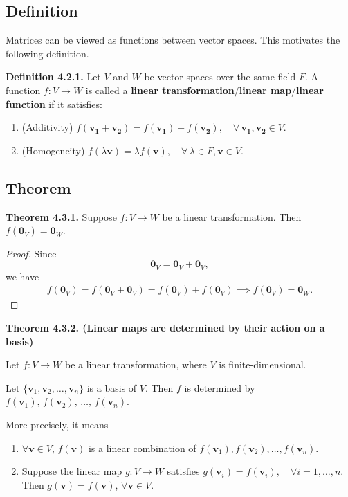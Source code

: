 \documentclass[12pt]{article}
\begin{document}
\subsection{Definition}

Matrices can be viewed as functions between vector spaces.  
This motivates the following definition.

\textbf{Definition 4.2.1.}
Let $V$ and $W$ be vector spaces over the same field $F$. A function $f:V\to W$ is called a
\textbf{linear transformation}/\textbf{linear map}/\textbf{linear function}
if it satisfies:

\begin{enumerate}
    \item (Additivity) $f(\mathbf{v_1+v_2})=f(\mathbf{v_1})+f(\mathbf{v_2}),\quad\forall\,\mathbf{v_1,v_2}\in V.$

    \item (Homogeneity) $f(\lambda \mathbf{v})=\lambda f(\mathbf{v}),\quad\forall\,\lambda\in F,\mathbf{v}\in V.$
\end{enumerate}

\subsection{Theorem}

\textbf{Theorem 4.3.1.}
Suppose $f:V\rightarrow W$ be a linear transformation. Then $f(\mathbf{0}_V)=\mathbf{0}_W$.

\begin{proof}
Since
\[
\mathbf{0}_V=\mathbf{0}_V+\mathbf{0}_V,
\]
we have
\[
\begin{aligned}
f(\mathbf{0}_V) =f(\mathbf{0}_V+\mathbf{0}_V)=f(\mathbf{0}_V)+f(\mathbf{0}_V) \implies f(\mathbf{0}_V)=\mathbf{0}_W.
\end{aligned}
\]

\end{proof}

\newpage

\textbf{Theorem 4.3.2. (Linear maps are determined by their action on a basis)}

Let $f:V\rightarrow W$ be a linear transformation, where $V$ is finite-dimensional.

Let $\{\mathbf{v}_1,\mathbf{v}_2,\ldots,\mathbf{v}_n\}$ is a basis of $V$. Then $f$ is determined by $f(\mathbf{v}_1),\,f(\mathbf{v}_2),\,\ldots,\,f(\mathbf{v}_n)$.

More precisely, it means

\begin{enumerate}
    \item $\forall \mathbf{v} \in V$, $f(\mathbf{v})$ is a linear combination of $f(\mathbf{v}_1),f(\mathbf{v}_2),\ldots,f(\mathbf{v}_n)$.

    \item Suppose the linear map $g:V\rightarrow W$ satisfies $g(\mathbf{v}_i)=f(\mathbf{v}_i),\quad\forall i=1,\ldots,n$.\\
    Then $g(\mathbf{v})=f(\mathbf{v})$, $\forall \mathbf{v}\in V$.
\end{enumerate}
\end{document}
